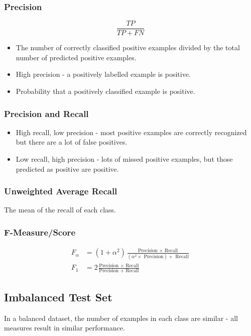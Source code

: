 \documentclass[11pt]{article}
\begin{document}
\subsubsection{Precision}
\[
  \frac{TP}{TP + FN} 
\]
\begin{itemize}
  \item The number of correctly classified positive examples divided by the total number of predicted positive examples.
  \item High precision - a positively labelled example is positive.
  \item Probability that a positively classified example is positive.
\end{itemize}

\subsubsection{Precision and Recall}
\begin{itemize}
  \item High recall, low precision - most positive examples are correctly recognized but there are a lot of false positives.
  \item Low recall, high precision - lots of missed positive examples, but those predicted as positive are positive.
\end{itemize}

\subsubsection{Unweighted Average Recall}
The mean of the recall of each class.

\subsubsection{F-Measure/Score}
\begin{align*}
  F_\alpha &= (1 + \alpha^2)\frac{\text{Precision } \times \text{ Recall}}{(\alpha^2 \times \text{ Precision}) + \text{ Recall}} \\
  F_1 &= 2\frac{\text{Precision } \times \text{ Recall}}{\text{Precision } + \text{ Recall}}
\end{align*}

\subsection{Imbalanced Test Set}
In a balanced dataset, the number of examples in each class are similar - all measures result in similar performance.
\end{document}
